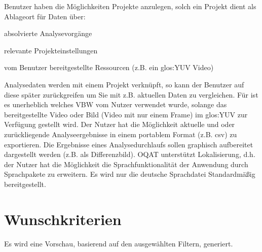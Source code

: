  Benutzer haben die Möglichkeiten Projekte anzulegen, solch ein Projekt dient als Ablageort für Daten über:
\begin{compactitem}
\item absolvierte Analysevorgänge
\item relevante Projekteinstellungen
\item vom Benutzer bereitgestellte Ressourcen (z.B. ein \gls{glos:YUV} Video)
\end{compactitem}
 	Analysedaten werden mit einem Projekt verknüpft, so kann der Benutzer auf diese später zurückgreifen um Sie mit z.B. aktuellen Daten zu vergleichen.
 Für \projektTitel ist es unerheblich welches \gls{VBW} vom Nutzer verwendet wurde, solange das bereitgestellte Video oder Bild (Video mit nur einem Frame) im \gls{glos:YUV} zur Verfügung gestellt wird.
 Der Nutzer hat die Möglichkeit aktuelle und oder zurückliegende Analyseergebnisse in einem portablem Format (z.B. \gls{csv}) zu exportieren.
 Die Ergebnisse eines Analysedurchlaufs sollen graphisch aufbereitet dargestellt werden (z.B. als Differenzbild).
 \gls{OQAT} unterstützt Lokalisierung, d.h. der Nutzer hat die Möglichkeit die Sprachfunktionalität der Anwendung durch Sprachpakete zu erweitern. Es wird nur die deutsche Sprachdatei Standardmäßig bereitgestellt.
\section{Wunschkriterien}
\setcounter{counterKriterien}{0}
 Es wird eine Vorschau, basierend auf den ausgewählten Filtern, generiert.

